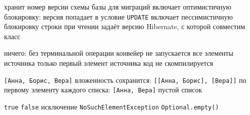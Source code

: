 \begin{enumerate}
  {}
  {}
  {}
  {}

  {хранит номер версии схемы базы для миграций}
  {включает оптимистичную блокировку: версия попадает в условие \texttt{UPDATE}}
  {включает пессимистичную блокировку строки при чтении}
  {задаёт версию Hibernate, с которой совместим класс}

  {ничего: без терминальной операции конвейер не запускается}
  {все элементы источника}
  {только первый элемент источника}
  {код не скомпилируется}

  {\texttt{[Анна, Борис, Вера]}}
  {вложенность сохранится: \texttt{[[Анна, Борис], [Вера]]}}
  {по первому элементу каждого списка: \texttt{[Анна, Вера]}}
  {пустой список}

  {\texttt{true}}
  {\texttt{false}}
  {исключение \texttt{NoSuchElementException}}
  {\texttt{Optional.empty()}}

\end{enumerate}
